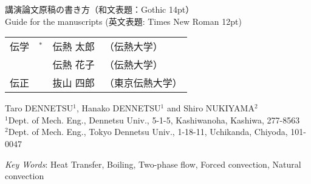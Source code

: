 \documentclass[
    paper=a4paper,      %
    article,            %
    fleqn,              %
    fontsize=10pt,      %
    jafontsize=10pt,    %
    head_space=20mm,    %
    foot_space=25mm,    %
    gutter=20mm,        %
    fore-edge=20mm      %
    ]{jlreq}            %
\begin{document}
\thispagestyle{normal}

\begin{center}
    \fontsize{14pt}{18pt}\selectfont
    {\gtfamily
    講演論文原稿の書き方（和文表題：Gothic 14pt）
    }\\\fontsize{12pt}{14pt}\selectfont
    Guide for the manuscripts (英文表題: Times New Roman 12pt)
    \vskip12pt\fontsize{10pt}{12pt}\selectfont
    \begin{tabular}{lrll}
      伝学  &$^\ast$\hspace{-3mm} &伝熱 太郎  &（伝熱大学）\\
        & &伝熱 花子  &（伝熱大学）\\
      伝正  & &抜山 四郎  &（東京伝熱大学）
    \end{tabular}
    \vskip12pt
    Taro DENNETSU$^1$, Hanako DENNETSU$^1$ and Shiro NUKIYAMA$^2$
    \\
    $^1$Dept. of Mech. Eng., Dennetsu Univ., 5-1-5, Kashiwanoha, Kashiwa, 277-8563 \\
    $^2$Dept. of Mech. Eng., Tokyo Dennetsu Univ., 1-18-11, Uchikanda, Chiyoda, 101-0047
    \vskip12pt
\end{center}
{\setlength{\leftskip}{\leftskip+15truemm}\setlength{\rightskip}{\rightskip+15truemm}%
\lipsum[1-2]
\par}%
\begin{center}
    \vskip12pt
    \textit{Key Words}: Heat Transfer, Boiling, Two-phase flow, Forced convection, Natural convection
    \vskip12pt
\end{center}


\end{document}
